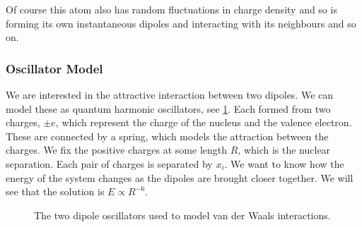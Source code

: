 \documentclass[fleqn]{NotesClass}
\begin{document}
    Of course this atom also has random fluctuations in charge density and so is forming its own instantaneous dipoles and interacting with its neighbours and so on.
    
    \subsubsection{Oscillator Model}
    We are interested in the attractive interaction between two dipoles.
    We can model these as quantum harmonic oscillators, see \cref{fig:dipole oscillators}.
    Each formed from two charges, \(\pm e\), which represent the charge of the nucleus and the valence electron.
    These are connected by a spring, which models the attraction between the charges.
    We fix the positive charges at some length \(R\), which is the nuclear separation.
    Each pair of charges is separated by \(x_i\).
    We want to know how the energy of the system changes as the dipoles are brought closer together.
    We will see that the solution is \(E \propto R^{-6}\).
    
    \begin{figure}
        \caption[Dipole oscillators and van der Waals interactions.]{The two dipole oscillators used to model van der Waals interactions.}
        \label{fig:dipole oscillators}
    \end{figure}
    
\end{document}
